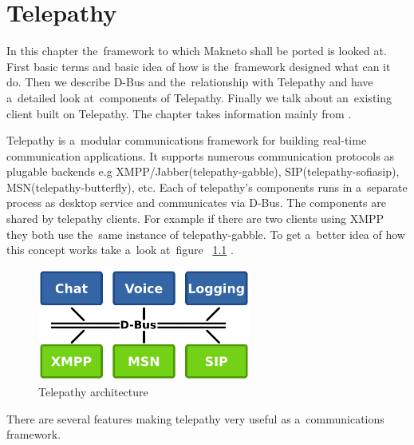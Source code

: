 
\chapter{Telepathy}\label{chapter:telepathy}
In this chapter the~framework to which Makneto shall be ported is looked at. First basic terms and basic idea of how is the~framework designed what can it do. Then we describe D-Bus and the~relationship with Telepathy and have a~detailed look at~components of Telepathy. Finally we talk about an~existing client built on Telepathy. The chapter takes information mainly from \cite{TPWiki, dbus}. 

Telepathy \cite{telepathy} is a~modular communications framework for building real-time communication applications. It supports numerous communication protocols as plugable backends e.g XMPP/Jabber(telepathy-gabble), SIP(telepathy-sofiasip), MSN(telepathy-butterfly), etc. Each of telepathy's components runs in a~separate process as desktop service and communicates via D-Bus. The components are shared by telepathy clients. For example if there are two clients using XMPP they both use the~same instance of telepathy-gabble. To get a~better idea of how this concept works take a~look at~figure ~\ref{fig:telepathyArchitecture} \cite{TPWiki}.

\begin{figure}[ht]
\begin{center}
	\includegraphics[width=7cm]{fig/telepathy-architecture-overview.png}
	\caption{Telepathy architecture \cite{TPWiki}}
	\label{fig:telepathyArchitecture}
\end{center}
\end{figure}


There are several features making telepathy very useful as a~communications framework.

